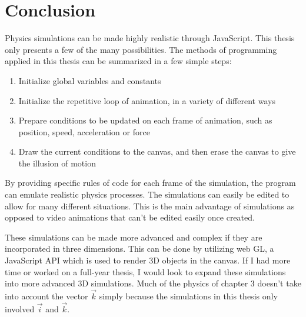 
\chapter{Conclusion} %

\label{Conclusion} %



Physics simulations can be made highly realistic through JavaScript.  This thesis only presents a few of the many possibilities.  The methods of programming applied in this thesis can be summarized in a few simple steps:

\begin{enumerate}  
\item Initialize global variables and constants
\item Initialize the repetitive loop of animation, in a variety of different ways
\item Prepare conditions to be updated on each frame of animation, such as position, speed, acceleration or force
\item Draw the current conditions to the canvas, and then erase the canvas to give the illusion of motion
\end{enumerate} 

By providing specific rules of code for each frame of the simulation, the program can emulate realistic physics processes.  The simulations can easily be edited to allow for many different situations.  This is the main advantage of simulations as opposed to video animations that can't be edited easily once created.     


These simulations can be made more advanced and complex if they are incorporated in three dimensions.  This can be done by utilizing web GL, a JavaScript API which is used to render 3D objects in the canvas.  If I had more time or worked on a full-year thesis, I would look to expand these simulations into more advanced 3D simulations.  Much of the physics of chapter 3 doesn't take into account the vector $\vec{k}$ simply because the simulations in this thesis only involved $\vec{i}$ and $\vec{k}$.  


